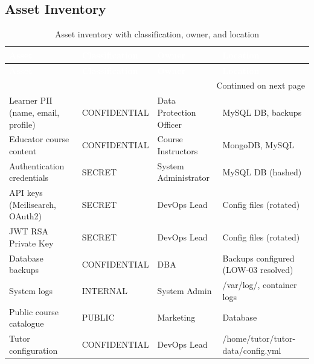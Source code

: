 \subsection{Asset Inventory}
\begin{center}
\begin{longtable}{|p{}|p{}|p{}|p{}|}
\caption[Asset Inventory]{Asset inventory with classification, owner, and location}
\label{tab:asset-inventory} \\
\hline
\rowcolor{mooveblue}
\textcolor{white}{\textbf{Asset}} & \textcolor{white}{\textbf{Classification}} & \textcolor{white}{\textbf{Owner}} & \textcolor{white}{\textbf{Location}} \\
\hline
\endfirsthead
\hline
\rowcolor{mooveblue}
\textcolor{white}{\textbf{Asset}} & \textcolor{white}{\textbf{Classification}} & \textcolor{white}{\textbf{Owner}} & \textcolor{white}{\textbf{Location}} \\
\hline
\endhead
\hline
\multicolumn{4}{|r|}{Continued on next page} \\
\hline
\endfoot
\hline
\endlastfoot
Learner PII (name, email, profile) & CONFIDENTIAL & Data Protection Officer & MySQL DB, backups \\
Educator course content & CONFIDENTIAL & Course Instructors & MongoDB, MySQL \\
Authentication credentials & SECRET & System Administrator & MySQL DB (hashed) \\
API keys (Meilisearch, OAuth2) & SECRET & DevOps Lead & Config files (rotated) \\
JWT RSA Private Key & SECRET & DevOps Lead & Config files (rotated) \\
Database backups & CONFIDENTIAL & DBA & Backups configured (LOW-03 resolved) \\
System logs & INTERNAL & System Admin & /var/log/, container logs \\
Public course catalogue & PUBLIC & Marketing & Database \\
Tutor configuration & CONFIDENTIAL & DevOps Lead & /home/tutor/tutor-data/config.yml \\
\hline
\end{longtable}
\end{center}

